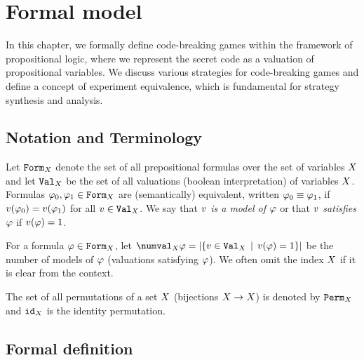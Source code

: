 \chapter{Formal model}

In this chapter, we formally define code-breaking games
  within the framework of propositional logic,
  where we represent the secret code as a valuation
  of propositional variables.
We discuss various strategies for code-breaking games and
  define a concept of experiment equivalence,
  which is fundamental for strategy synthesis and analysis.

\section{Notation and Terminology}
Let $\mathtt{Form}_X$ denote the set of all prepositional formulas over
  the set of variables $X$ and let
  $\mathtt{Val}_X$ be the set of all valuations (boolean interpretation)
  of variables $X$.
Formulas $\varphi_0, \varphi_1 \in \mathtt{Form}_X$ are (semantically) equivalent,
  written $\varphi_0 \equiv \varphi_1$, if
  $v(\varphi_0) = v(\varphi_1)$ for all $v\in\mathtt{Val}_X$.
We say that \emph{$v$ is a model of $\varphi$}
  or that \emph{$v$ satisfies $\varphi$}
  if $v(\varphi) = 1$.

For a formula $\varphi\in\mathtt{Form}_X$, let
  $\numval_\Var{\form} = |\{ \val\in\Val_\Var \| \val(\form) = 1 \}|$
  be the number of models of $\varphi$ (valuations satisfying $\varphi$).
We often omit the index $X$ if it is clear from the context.


The set of all permutations of a set $X$ (bijections $X->X$)
  is denoted by $\mathtt{Perm}_X$ and
  $\mathtt{id}_X$ is the identity permutation.


\section{Formal definition}


